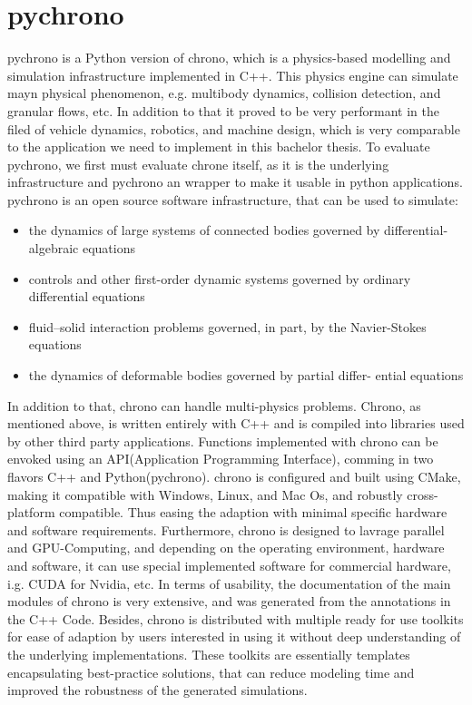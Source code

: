 \documentclass[
	12pt, 
	a4paper, 
]{article}
\begin{document}
	\section{pychrono}
	pychrono is a Python version of chrono, which is a physics-based modelling and simulation infrastructure implemented in C++. This physics engine can simulate mayn physical phenomenon, e.g. multibody dynamics, collision detection, and granular flows, etc. In addition to that it proved to be very performant in the filed of vehicle dynamics, robotics, and machine design,\cite{tasora2020chrono} which is very comparable to the application we need to implement in this bachelor thesis. To evaluate pychrono, we first must evaluate chrone itself, as it is the underlying infrastructure and pychrono an wrapper to make it usable in python applications.\newline
	pychrono is an open source software infrastructure, that can be used to simulate\cite{tasora2020chrono}:
	\begin{itemize}
		\item the dynamics of large systems of connected bodies governed by differential-algebraic equations
		\item controls and other first-order dynamic systems governed by ordinary differential equations
		\item fluid–solid interaction problems governed, in part, by the Navier-Stokes equations
		\item the dynamics of deformable bodies governed by partial differ- ential equations
	\end{itemize}
	In addition to that, chrono can handle multi-physics problems. Chrono, as mentioned above, is written entirely with C++ and is compiled into libraries used by other third party applications. Functions implemented with chrono can be envoked using an API(Application Programming Interface), comming in two flavors C++ and Python(pychrono). chrono is configured and built using CMake, making it compatible with Windows, Linux, and Mac Os, and robustly cross-platform compatible. Thus easing the adaption with minimal specific hardware and software requirements. Furthermore, chrono is designed to lavrage parallel and GPU-Computing, and depending on the operating environment, hardware and software, it can use special implemented software for commercial hardware, i.g. CUDA for Nvidia, etc. In terms of usability, the documentation of the main modules of chrono is very extensive, and was generated from the annotations in the C++ Code. Besides, chrono is distributed with multiple ready for use toolkits for ease of adaption by users interested in using it without deep understanding of the underlying implementations. These toolkits are essentially templates encapsulating best-practice solutions, that can reduce modeling time and improved the robustness of the generated simulations\cite{tasora2020chrono}.
\end{document}
